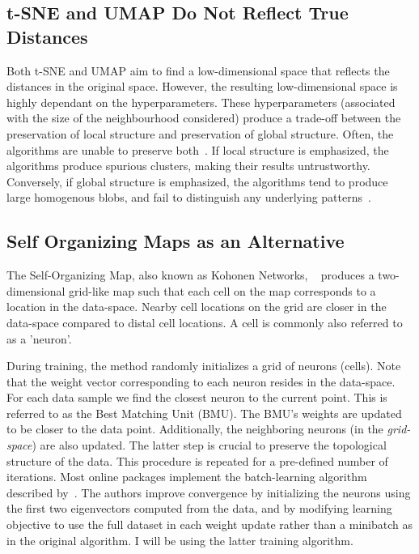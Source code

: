 \subsection*{t-SNE and UMAP Do Not Reflect True Distances}


Both t-SNE and UMAP aim to find a low-dimensional space that reflects the distances in the original space. However, the resulting low-dimensional space is highly dependant on the hyperparameters. These hyperparameters (associated with the size of the neighbourhood considered) produce a trade-off between the preservation of local structure and preservation of global structure. Often, the algorithms are unable to preserve both~\cite{pacmap}. If local structure is emphasized, the algorithms produce spurious clusters, making their results untrustworthy. Conversely, if global structure is emphasized, the algorithms tend to produce large homogenous blobs, and fail to distinguish any underlying patterns~\cite{leiQuantifyingImpactUninformative2023}.


\subsection*{Self Organizing Maps as an Alternative}

The Self-Organizing Map, also known as Kohonen Networks, ~\cite{kohonen1990self} produces a two-dimensional grid-like map such that each cell on the map corresponds to a location in the data-space. Nearby cell locations on the grid are closer in the data-space compared to distal cell locations. A cell is commonly also referred to as a 'neuron'.

During training, the method randomly initializes a grid of neurons (cells). Note that the weight vector corresponding to each neuron resides in the data-space. For each data sample we find the closest neuron to the current point. This is referred to as the Best Matching Unit (BMU). The BMU's weights are updated to be closer to the data point. Additionally, the neighboring neurons (in the \textit{grid-space}) are also updated. The latter step is crucial to preserve the topological structure of the data. This procedure is repeated for a pre-defined number of iterations. Most online packages implement the batch-learning algorithm described by~\cite{kinouchi2002quick}. The authors improve convergence by initializing the neurons using the first two eigenvectors computed from the data, and by modifying learning objective to use the full dataset in each weight update rather than a minibatch as in the original algorithm.  I will be using the latter training algorithm.

